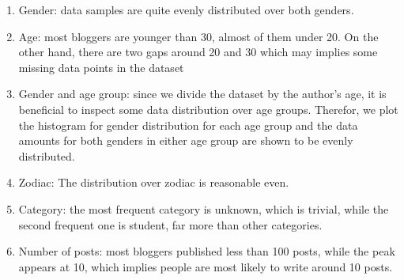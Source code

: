 \documentclass[conference]{IEEEtran}
\providecommand{\tightlist}{%
  \setlength{\itemsep}{0pt}\setlength{\parskip}{0pt}
}
\begin{document}
\begin{enumerate}
\tightlist
\item
  Gender: data samples are quite evenly distributed over both genders.
\item
  Age: most bloggers are younger than 30, almost of them under 20. On
  the other hand, there are two gaps around 20 and 30 which may implies
  some missing data points in the dataset
\item
  Gender and age group: since we divide the dataset by the author's age,
  it is beneficial to inspect some data distribution over age groups.
  Therefor, we plot the histogram for gender distribution for each age
  group and the data amounts for both genders in either age group are
  shown to be evenly distributed.
\item
  Zodiac: The distribution over zodiac is reasonable even.
\item
  Category: the most frequent category is unknown, which is trivial,
  while the second frequent one is student, far more than other
  categories.
\item
  Number of posts: most bloggers published less than 100 posts, while
  the peak appears at 10, which implies people are most likely to write
  around 10 posts.
\end{enumerate}
\end{document}
